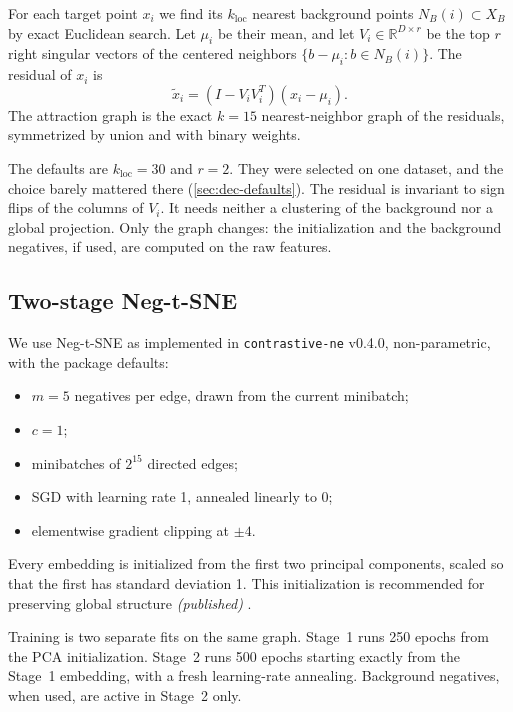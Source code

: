 \documentclass[10pt]{article}
\newcommand{\cpub}{\textit{\small (published)}}
\newcommand{\T}{^{T}}
\newcommand{\R}{\mathbb{R}}
\newcommand{\kloc}{k_{\mathrm{loc}}}
\begin{document}
For each target point $x_i$ we find its $\kloc$ nearest background points $N_B(i) \subset X_B$ by exact Euclidean search. Let $\mu_i$ be their mean, and let $V_i \in \R^{D\times r}$ be the top $r$ right singular vectors of the centered neighbors $\{b - \mu_i : b \in N_B(i)\}$. The residual of $x_i$ is
\begin{equation}
  \tilde x_i = (I - V_i V_i\T)(x_i - \mu_i).
  \label{eq:residual}
\end{equation}
The attraction graph is the exact $k = 15$ nearest-neighbor graph of the residuals, symmetrized by union and with binary weights.

The defaults are $\kloc = 30$ and $r = 2$. They were selected on one dataset, and the choice barely mattered there (\cref{sec:dec-defaults}). The residual is invariant to sign flips of the columns of $V_i$. It needs neither a clustering of the background nor a global projection. Only the graph changes: the initialization and the background negatives, if used, are computed on the raw features.

\subsection{Two-stage Neg-t-SNE}

We use Neg-t-SNE \cite{damrich2023tsne} as implemented in \texttt{contrastive-ne} v0.4.0, non-parametric, with the package defaults:
\begin{itemize}
  \item $m = 5$ negatives per edge, drawn from the current minibatch;
  \item $c = 1$;
  \item minibatches of $2^{15}$ directed edges;
  \item SGD with learning rate 1, annealed linearly to 0;
  \item elementwise gradient clipping at $\pm4$.
\end{itemize}
Every embedding is initialized from the first two principal components, scaled so that the first has standard deviation 1. This initialization is recommended for preserving global structure \cpub{} \cite{kobak2021init,damrich2023tsne}.

Training is two separate fits on the same graph. Stage~1 runs 250 epochs from the PCA initialization. Stage~2 runs 500 epochs starting exactly from the Stage~1 embedding, with a fresh learning-rate annealing. Background negatives, when used, are active in Stage~2 only.
\end{document}

